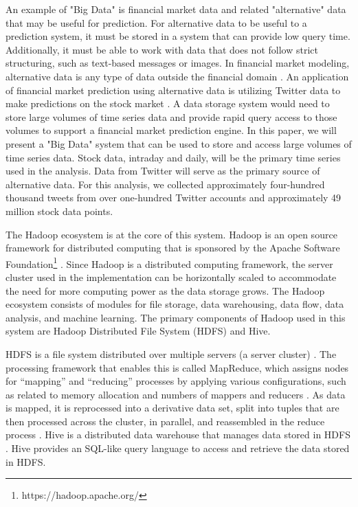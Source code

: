 \documentclass[journal]{IEEEtran}
\begin{document}

An example of "Big Data" is financial market data and
 related "alternative" data that may be useful for prediction.
For alternative data to be useful to a prediction system,
 it must be stored in a system that can provide low query time.
Additionally, it must be able to work with data that does not follow strict structuring,
 such as text-based messages or images.
In financial market modeling, alternative data is any type of data outside the
 financial domain \cite{xiao2018trading}.
An application of financial market prediction using alternative data is
 utilizing Twitter data to make predictions on the stock market \cite{twittermood}.
A data storage system would need to store large volumes of time series data and
 provide rapid query access to those volumes to support a financial 
 market prediction engine.
In this paper, we will present a "Big Data" system that can be used to store and
 access large volumes of time series data. 
Stock data, intraday and daily,
 will be the primary time series used in the analysis.
Data from Twitter will serve as the primary source of alternative data.
For this analysis, we collected approximately four-hundred thousand tweets from over 
one-hundred Twitter accounts and approximately 49 million stock data points.


The Hadoop ecosystem is at the core of this system.
Hadoop is an open source framework for distributed computing
 that is sponsored by the 
 Apache Software Foundation\footnote{https://hadoop.apache.org/} \cite{HDFSarchitecture}.
Since Hadoop is a distributed computing framework,
 the server cluster used in the implementation can be horizontally scaled to
 accommodate the need for more computing power as the data storage grows.
The Hadoop ecosystem consists of modules for file storage, data warehousing,
 data flow, data analysis, and machine learning.
The primary components of Hadoop used in this system are
 Hadoop Distributed File System (HDFS) and Hive.

HDFS is a file system distributed over multiple servers (a server cluster) \cite{HDFSarchitecture}.
The processing framework that enables this is called MapReduce, 
 which assigns nodes for ``mapping'' and ``reducing'' processes by applying  
 various configurations, such as related to memory allocation and numbers
 of mappers and reducers \cite{MappingReducing}.
As data is mapped, it is reprocessed into a derivative data set,
 split into tuples that are then processed across the cluster, in parallel,
 and reassembled in the reduce process \cite{MappingReducing}.
Hive is a distributed data warehouse that manages data stored in HDFS \cite{HDFSarchitecture}.
Hive provides an SQL-like query language to access and
 retrieve the data stored in HDFS.
\end{document}
